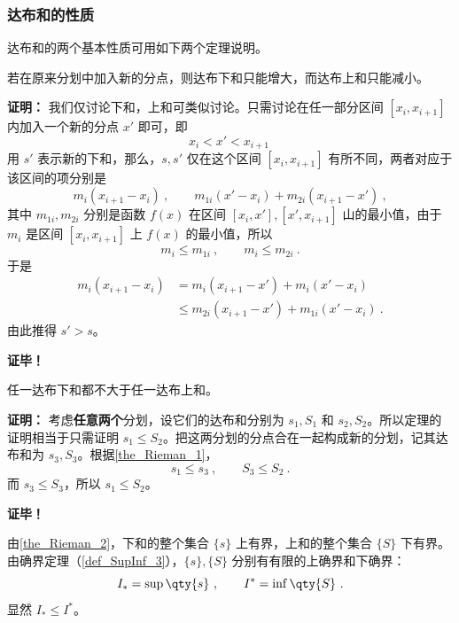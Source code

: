\subsubsection{达布和的性质}
达布和的两个基本性质可用如下两个定理说明。
\begin{theorem}{}\label{the_Rieman_1}
若在原来分划中加入新的分点，则达布下和只能增大，而达布上和只能减小。
\end{theorem}
\textbf{证明：}
我们仅讨论下和，上和可类似讨论。只需讨论在任一部分区间 $[x_i,x_{i+1}]$ 内加入一个新的分点 $x'$ 即可，即
\begin{equation}
x_i<x'<x_{i+1}~
\end{equation}
用 $s'$ 表示新的下和，那么，$s,s'$ 仅在这个区间  $[x_i,x_{i+1}]$ 有所不同，两者对应于该区间的项分别是
\begin{equation}
m_i(x_{i+1}-x_i)~,\qquad m_{1i}(x'-x_i)+m_{2i}(x_{i+1}-x')~,
\end{equation}
其中 $m_{1i},m_{2i}$ 分别是函数 $f(x)$ 在区间 $[x_i,x'],[x',x_{i+1}]$ 山的最小值，由于 $m_i$ 是区间 $[x_i,x_{i+1}]$ 上 $f(x)$ 的最小值，所以
\begin{equation}
m_i\leq m_{1i}~,\qquad m_i\leq m_{2i}~.
\end{equation}
于是
\begin{equation}
\begin{aligned}
m_i(x_{i+1}-x_i)&=m_i(x_{i+1}-x')+m_i(x'-x_i)\\
&\leq m_{2i}(x_{i+1}-x')+m_{1i}(x'-x_i)~.
\end{aligned}
\end{equation}
由此推得 $s'>s$。

\textbf{证毕！}
\begin{theorem}{}\label{the_Rieman_2}
任一达布下和都不大于任一达布上和。
\end{theorem}
\textbf{证明：}
考虑\textbf{任意两个}分划，设它们的达布和分别为 $s_1,S_1$ 和 $s_2,S_2$。所以定理的证明相当于只需证明 $s_1\leq S_2$。把这两分划的分点合在一起构成新的分划，记其达布和为 $s_3,S_3$。根据\autoref{the_Rieman_1}，
\begin{equation}
s_1\leq s_3~,\qquad S_3\leq S_2~.
\end{equation}
 而 $s_3\leq S_3$，所以 $s_1\leq S_2$。

\textbf{证毕！}

由\autoref{the_Rieman_2}，下和的整个集合 $\{s\}$ 上有界，上和的整个集合 $\{S\}$ 下有界。由确界定理（\autoref{def_SupInf_3}），$\{s\},\{S\}$ 分别有有限的上确界和下确界：
\begin{equation}
I_*=\sup\qty{s}~,\qquad I^*=\inf\qty{S}~.
\end{equation}
显然 $I_*\leq I^*$。


